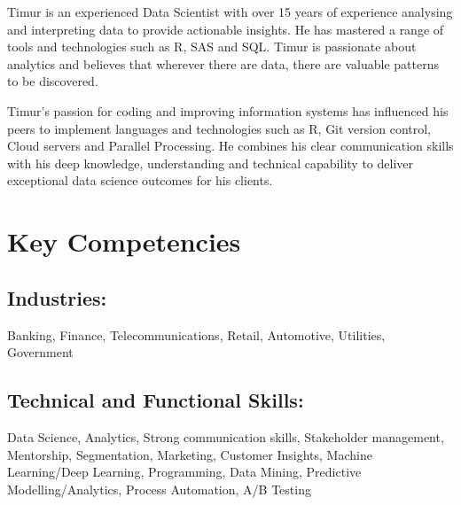 \documentclass{article}
\begin{document}

\pagestyle{fancy}
\fancyhf{} %



Timur is an experienced Data Scientist with over 15 years of experience analysing and interpreting data to provide actionable insights. He has mastered a range of tools and technologies such as R, SAS and SQL. Timur is passionate about analytics and believes that wherever there are data, there are valuable patterns to be discovered.

\smallskip

Timur's passion for coding and improving information systems has influenced his peers to implement languages and technologies such as R, Git version control, Cloud servers and 
Parallel Processing. He combines his clear communication skills with his deep knowledge, understanding and technical capability to deliver exceptional data science outcomes for his clients.

\section{Key Competencies}
\subsection{Industries:}
Banking, Finance, Telecommunications, Retail, Automotive, Utilities, Government

\subsection{Technical and Functional Skills:}
Data Science, Analytics, Strong communication skills, Stakeholder management, Mentorship, Segmentation, Marketing, Customer Insights, Machine Learning/Deep Learning, Programming, Data Mining, Predictive Modelling/Analytics, Process Automation, A/B Testing
\end{document}
